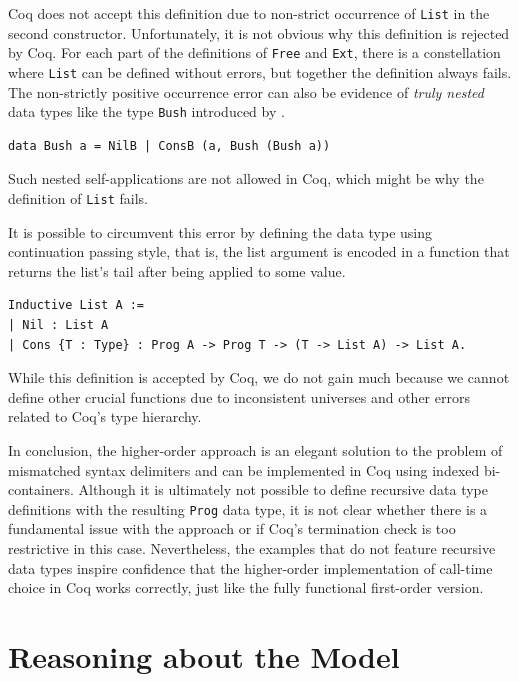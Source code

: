 \documentclass[a4paper, 11pt, fleqn, twoside]{scrreprt}
\newcommand{\hinl}[1]{\texttt{#1}}
\newcommand{\cinl}[1]{\texttt{#1}}
\begin{document}
Coq does not accept this definition due to non-strict occurrence of \cinl{List} in the second constructor.
Unfortunately, it is not obvious why this definition is rejected by Coq.
For each part of the definitions of \cinl{Free} and \cinl{Ext}, there is a constellation where \cinl{List} can be defined without errors, but together the definition always fails.
The non-strictly positive occurrence error can also be evidence of \textit{truly nested} data types like the type \hinl{Bush} introduced by \citet{bird1998nested}.

\begin{verbatim}
data Bush a = NilB | ConsB (a, Bush (Bush a))
\end{verbatim}

Such nested self-applications are not allowed in Coq, which might be why the definition of \cinl{List} fails.

It is possible to circumvent this error by defining the data type using continuation passing style, that is, the list argument is encoded in a function that returns the list's tail after being applied to some value.

\begin{verbatim}
Inductive List A :=
| Nil : List A
| Cons {T : Type} : Prog A -> Prog T -> (T -> List A) -> List A.
\end{verbatim}

While this definition is accepted by Coq, we do not gain much because we cannot define other crucial functions due to inconsistent universes and other errors related to Coq's type hierarchy.

In conclusion, the higher-order approach is an elegant solution to the problem of mismatched syntax delimiters and can be implemented in Coq using indexed bi-containers.
Although it is ultimately not possible to define recursive data type definitions with the resulting \cinl{Prog} data type, it is not clear whether there is a fundamental issue with the approach or if Coq's termination check is too restrictive in this case.
Nevertheless, the examples that do not feature recursive data types inspire confidence that the higher-order implementation of call-time choice in Coq works correctly, just like the fully functional first-order version.

\chapter{Reasoning about the Model}
\label{ch:progsInCoq}
\end{document}
